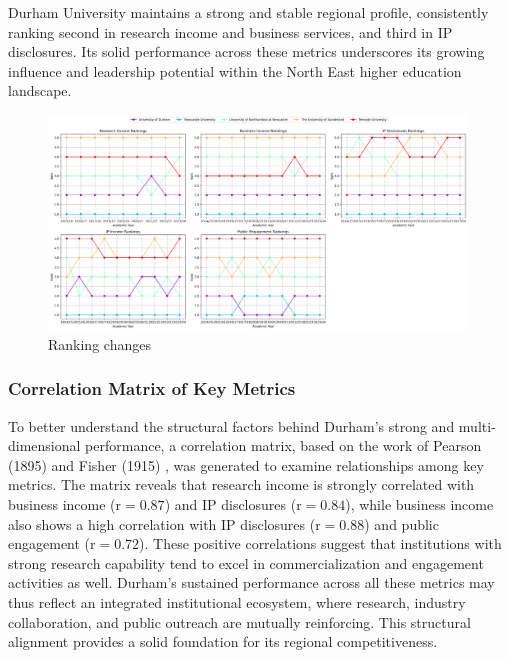 \documentclass[journal,onecolumn, 10pt,draftclsnofoot]{IEEEtran}
\begin{document}
Durham University maintains a strong and stable regional profile, consistently ranking second in research income and business services, and third in IP disclosures. Its solid performance across these metrics underscores its growing influence and leadership potential within the North East higher education landscape.


\begin{figure}[h]
\centering
\includegraphics[width=0.99\textwidth]{Fig/figure35.ranking_changes.png}
\caption{Ranking changes}
\label{fig:ranking-changes}
\end{figure}

\subsubsection{Correlation Matrix of Key Metrics}

To better understand the structural factors behind Durham's strong and multi-dimensional performance, a correlation matrix, based on the work of Pearson (1895) \cite{pearson1895notes} and Fisher (1915) \cite{fisher1915frequency}, was generated to examine relationships among key metrics. The matrix reveals that research income is strongly correlated with business income ($\mathrm{r}=0.87$) and IP disclosures ($\mathrm{r}=0.84$), while business income also shows a high correlation with IP disclosures ($\mathrm{r}=0.88$) and public engagement ($\mathrm{r}=0.72$). These positive correlations suggest that institutions with strong research capability tend to excel in commercialization and engagement activities as well. Durham's sustained performance across all these metrics may thus reflect an integrated institutional ecosystem, where research, industry collaboration, and public outreach are mutually reinforcing. This structural alignment provides a solid foundation for its regional competitiveness.
\end{document}
